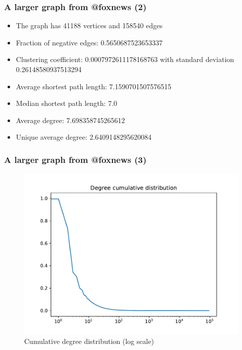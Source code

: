 \documentclass{beamer}
\begin{document}
\begin{frame}[c]
    \frametitle{A larger graph from @foxnews (2)}
    \begin{itemize}
        \item The graph has 41188 vertices and 158540 edges
        \item Fraction of negative edges: \num{0.5650687523653337}
        \item Clustering coefficient: \num{0.0007972611178168763} with standard
            deviation \num{0.26148580937513294}
        \item Average shortest path length: \num{7.1590701507576515}
        \item Median shortest path length: 7.0
        \item Average degree: \num{7.698358745265612}
        \item Unique average degree: \num{2.6409148295620084}
    \end{itemize}

\end{frame}

\begin{frame}[c]
    \frametitle{A larger graph from @foxnews (3)}
    \begin{figure}[htpb]
        \centering
        \includegraphics[width=0.8\linewidth]{out/foxnews400/foxnews400-degree-dist.pdf}
        \caption{Cumulative degree distribution (log scale)}%
    \end{figure}
\end{frame}
\end{document}
